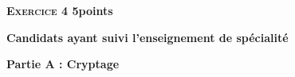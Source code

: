 \documentclass[11pt,a4paper,answers,fancyhdr]{exam}
\begin{document}
\vspace{0,5cm}

\newpage

\label{exercice 4-spé}

\textbf{\textsc{Exercice 4} \hfill 5points}
 
\textbf{Candidats ayant suivi l'enseignement de spécialité}

\medskip

%
%
%
%
%
%
%
%
%
%

\textbf{Partie A : Cryptage}

\medskip

\end{document}
